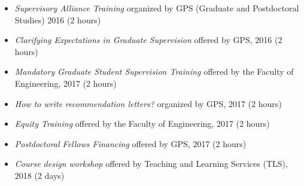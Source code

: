 \begin{itemize}
\item \emph{Supervisory Alliance Training} organized by GPS (Graduate and Postdoctoral Studies)  2016 (2 hours)
\item \emph{Clarifying Expectations in Graduate Supervision} offered by GPS,  2016 (2 hours)
\item \emph{Mandatory Graduate Student Supervision Training} offered by the Faculty of Engineering,  2017 (2 hours)
\item \emph{How to write recommendation letters?} organized by GPS, 2017 (2 hours)
\item \emph{Equity Training} offered by the Faculty of Engineering, 2017 (2 hours)
\item \emph{Postdoctoral Fellows Financing} offered by GPS, 2017 (2 hours)
\item \emph{Course design workshop} offered by Teaching and Learning Services (TLS), 2018 (2 days)
\end{itemize}

%
%






%
